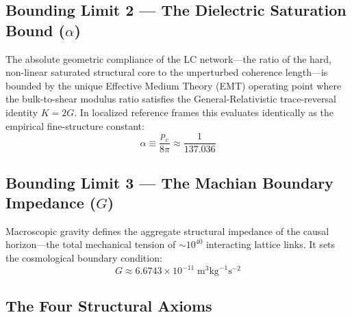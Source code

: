 \subsection*{Bounding Limit 2 --- The Dielectric Saturation Bound ($\alpha$)}

The absolute geometric compliance of the LC network---the ratio of the hard,
non-linear saturated structural core to the unperturbed coherence length---is
bounded by the unique Effective Medium Theory (EMT) operating point where
the bulk-to-shear modulus ratio satisfies the General-Relativistic
trace-reversal identity $K = 2G$. In localized reference frames this
evaluates identically as the empirical fine-structure constant:
\begin{equation}
    \alpha \equiv \frac{p_c}{8\pi}
    \approx \frac{1}{137.036}
    \label{eq:alpha_def}
\end{equation}

\subsection*{Bounding Limit 3 --- The Machian Boundary Impedance ($G$)}

Macroscopic gravity defines the aggregate structural impedance of the causal
horizon---the total mechanical tension of $\sim\!10^{40}$ interacting lattice
links. It sets the cosmological boundary condition:
\begin{equation}
    G \approx 6.6743 \times 10^{-11}\;\text{m}^3\text{kg}^{-1}\text{s}^{-2}
    \label{eq:G_input}
\end{equation}

\subsection*{The Four Structural Axioms}

